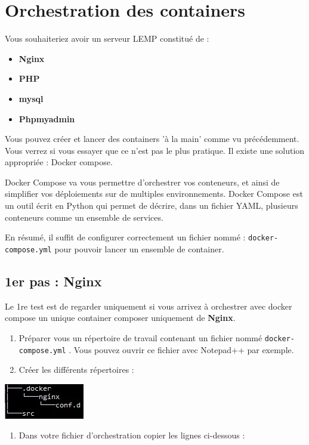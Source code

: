 \documentclass[french, 12pt]{article}%
\newcommand{\itemE}{\item[$\bullet$]}
\newcommand{\titreencadre}{Titre}
\newenvironment{encadre}[1]{\renewcommand{\titreencadre}{#1}
	\begin{mdframed}[style=encadrestyle]
	\vspace{0.5\baselineskip}
	}{%
	\end{mdframed}}
\begin{document}



\section{Orchestration des containers}

Vous souhaiteriez avoir un serveur LEMP constitué de : 
\begin{itemize}
\itemE \textbf{Nginx}
\itemE \textbf{PHP}
\itemE \textbf{mysql}
\itemE \textbf{Phpmyadmin}
\end{itemize}

Vous pouvez créer et lancer des containers 'à la main' comme vu précédemment. Vous verrez si vous essayer que ce n'est pas le plus pratique. Il existe une solution appropriée : Docker compose. 


\begin{encadre}{Docker compose}
Docker Compose va vous permettre d'orchestrer vos conteneurs, et ainsi de simplifier vos déploiements sur de multiples environnements. Docker Compose est un outil écrit en Python qui permet de décrire, dans un fichier YAML, plusieurs conteneurs comme un ensemble de services.
\end{encadre} 

En résumé, il suffit de configurer correctement un fichier nommé : \verb?docker-compose.yml? pour pouvoir lancer un ensemble de container.

\subsection{1er pas : Nginx}

Le 1re test est de regarder uniquement si vous arrivez à orchestrer  avec docker compose un unique container composer uniquement de \textbf{Nginx}. 

\begin{enumerate}
\item Préparer vous un répertoire de travail contenant un fichier nommé \verb?docker-compose.yml? . Vous pouvez ouvrir ce fichier avec Notepad++ par exemple. 
\item Créer les différents répertoires :  
\end{enumerate}


\begin{center}
\includegraphics[scale=0.7]{./ressource/arboresence_docker}
\end{center}
\begin{enumerate}[resume]
\item Dans votre fichier d'orchestration copier les lignes ci-dessous : 
\end{enumerate}
\end{document}
